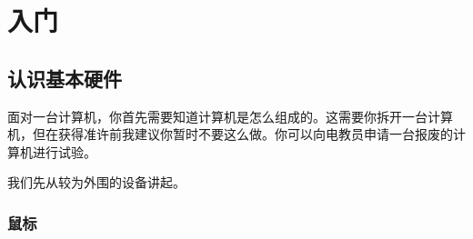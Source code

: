 \chapter{入门}
\section{认识基本硬件}
面对一台计算机，你首先需要知道计算机是怎么组成的。这需要你拆开一台计算机，但在获得准许前我建议你暂时不要这么做。你可以向电教员申请一台报废的计算机进行试验。\par
我们先从较为外围的设备讲起。
\subsection{鼠标}
